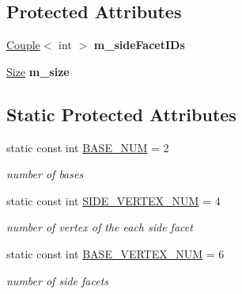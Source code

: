 \subsection*{Protected Attributes}
\begin{DoxyCompactItemize}
\item 
\mbox{\label{class_column_aad02a5a2b9c19658759d57d399e84ce4}} 
\mbox{\hyperlink{class_couple}{Couple}}$<$ int $>$ {\bfseries m\+\_\+side\+Facet\+I\+Ds}
\item 
\mbox{\label{class_column_a6d4ce98d9797d37ce75073ab9853e218}} 
\mbox{\hyperlink{struct_size}{Size}} {\bfseries m\+\_\+size}
\end{DoxyCompactItemize}
\subsection*{Static Protected Attributes}
\begin{DoxyCompactItemize}
\item 
\mbox{\label{class_column_a5988fac458953d180b4dcb1a5d2826fa}} 
static const int \mbox{\hyperlink{class_column_a5988fac458953d180b4dcb1a5d2826fa}{B\+A\+S\+E\+\_\+\+N\+UM}} = 2
\begin{DoxyCompactList}\small\item\em number of bases \end{DoxyCompactList}\item 
\mbox{\label{class_column_aa3e3e5d6543b7e34191914ecdd7368bd}} 
static const int \mbox{\hyperlink{class_column_aa3e3e5d6543b7e34191914ecdd7368bd}{S\+I\+D\+E\+\_\+\+V\+E\+R\+T\+E\+X\+\_\+\+N\+UM}} = 4
\begin{DoxyCompactList}\small\item\em number of vertex of the each side facet \end{DoxyCompactList}\item 
\mbox{\label{class_column_a54b8114ca0318ba212dfe2bda99e0918}} 
static const int \mbox{\hyperlink{class_column_a54b8114ca0318ba212dfe2bda99e0918}{B\+A\+S\+E\+\_\+\+V\+E\+R\+T\+E\+X\+\_\+\+N\+UM}} = 6
\begin{DoxyCompactList}\small\item\em number of side facets \end{DoxyCompactList}\end{DoxyCompactItemize}
